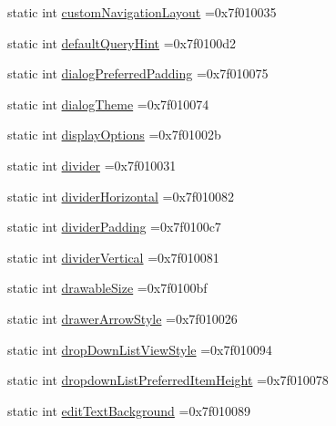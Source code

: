 \begin{DoxyCompactItemize}
\item 
static int \hyperlink{classandroid_1_1support_1_1v7_1_1cardview_1_1R_1_1attr_aacada8734410b34e167ba3c763dc7be6}{custom\+Navigation\+Layout} =0x7f010035
\item 
static int \hyperlink{classandroid_1_1support_1_1v7_1_1cardview_1_1R_1_1attr_a48bf1b18dbbe3f6b6ec0ba59da897ce9}{default\+Query\+Hint} =0x7f0100d2
\item 
static int \hyperlink{classandroid_1_1support_1_1v7_1_1cardview_1_1R_1_1attr_ae210dc8e855ef1c7aa0c74827cef736b}{dialog\+Preferred\+Padding} =0x7f010075
\item 
static int \hyperlink{classandroid_1_1support_1_1v7_1_1cardview_1_1R_1_1attr_a73935a8052ea75bfe3670af44157de18}{dialog\+Theme} =0x7f010074
\item 
static int \hyperlink{classandroid_1_1support_1_1v7_1_1cardview_1_1R_1_1attr_a95f87179f6c66822d84023d578c161b2}{display\+Options} =0x7f01002b
\item 
static int \hyperlink{classandroid_1_1support_1_1v7_1_1cardview_1_1R_1_1attr_af372fbb85ebef799e994b3e8ddd80ffc}{divider} =0x7f010031
\item 
static int \hyperlink{classandroid_1_1support_1_1v7_1_1cardview_1_1R_1_1attr_a9914d0b900074616aa5616908df332f2}{divider\+Horizontal} =0x7f010082
\item 
static int \hyperlink{classandroid_1_1support_1_1v7_1_1cardview_1_1R_1_1attr_a1f45ca6be4199a2786b81427253f369b}{divider\+Padding} =0x7f0100c7
\item 
static int \hyperlink{classandroid_1_1support_1_1v7_1_1cardview_1_1R_1_1attr_a2909e331e64b74973dbf1b900fdc882a}{divider\+Vertical} =0x7f010081
\item 
static int \hyperlink{classandroid_1_1support_1_1v7_1_1cardview_1_1R_1_1attr_a1156b8c69ce20341c6ffdec0e8f148f6}{drawable\+Size} =0x7f0100bf
\item 
static int \hyperlink{classandroid_1_1support_1_1v7_1_1cardview_1_1R_1_1attr_a8b6ae72db99da4bb6ed4abcd3bcf11bd}{drawer\+Arrow\+Style} =0x7f010026
\item 
static int \hyperlink{classandroid_1_1support_1_1v7_1_1cardview_1_1R_1_1attr_a0ebf51c52ff5aa7a4447b55246bd588d}{drop\+Down\+List\+View\+Style} =0x7f010094
\item 
static int \hyperlink{classandroid_1_1support_1_1v7_1_1cardview_1_1R_1_1attr_abd1874e372581dedbc2529cb02c57d06}{dropdown\+List\+Preferred\+Item\+Height} =0x7f010078
\item 
static int \hyperlink{classandroid_1_1support_1_1v7_1_1cardview_1_1R_1_1attr_a2a236b6fb939f8b88f2240c34a13b959}{edit\+Text\+Background} =0x7f010089

\end{DoxyCompactItemize}
